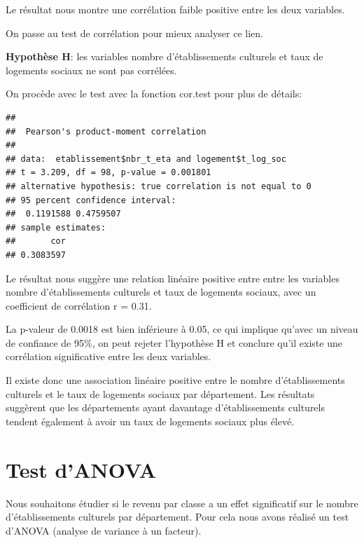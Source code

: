 \documentclass[mstat,12pt]{unswthesis}
\begin{document}
\medskip

Le résultat nous montre une corrélation faible positive entre les deux
variables.

\medskip

On passe au test de corrélation pour mieux analyser ce lien.

\medskip

\textbf{Hypothèse H}: les variables nombre d'établissements culturels et
taux de logements sociaux ne sont pas corrélées.

\medskip

On procède avec le test avec la fonction cor.test pour plus de détails:

\medskip

\begin{verbatim}
## 
##  Pearson's product-moment correlation
## 
## data:  etablissement$nbr_t_eta and logement$t_log_soc
## t = 3.209, df = 98, p-value = 0.001801
## alternative hypothesis: true correlation is not equal to 0
## 95 percent confidence interval:
##  0.1191588 0.4759507
## sample estimates:
##       cor 
## 0.3083597
\end{verbatim}

\medskip

Le résultat nous suggère une relation linéaire positive entre entre les
variables nombre d'établissements culturels et taux de logements
sociaux, avec un coefficient de corrélation r = 0.31.

\medskip

La p-valeur de 0.0018 est bien inférieure à 0.05, ce qui implique
qu'avec un niveau de confiance de 95\%, on peut rejeter l'hypothèse H et
conclure qu'il existe une corrélation significative entre les deux
variables.

\medskip

Il existe donc une association linéaire positive entre le nombre
d'établissements culturels et le taux de logements sociaux par
département. Les résultats suggèrent que les départements ayant
davantage d'établissements culturels tendent également à avoir un taux
de logements sociaux plus élevé.

\bigskip

\section{Test d'ANOVA}\label{test-danova}

Nous souhaitons étudier si le revenu par classe a un effet significatif
sur le nombre d'établissements culturels par département. Pour cela nous
avons réalisé un test d'ANOVA (analyse de variance à un facteur).
\end{document}
